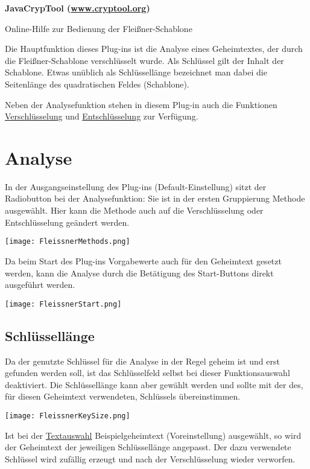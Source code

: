 \documentclass[fontsize=12pt, DIV=15, parskip=half-]{scrartcl}
\theoremstyle{break}
\begin{document}
\begin{center}
\Large\bfseries\sffamily JavaCrypTool (\url{www.cryptool.org})

Online-Hilfe zur Bedienung der Fleißner-Schablone  \\[0.1\baselineskip]
\normalsize\normalfont 
\end{center}
\vspace*{0.5\baselineskip}


\tableofcontents
\newpage

Die Hauptfunktion dieses Plug-ins ist die Analyse eines Geheimtextes, der durch die Fleißner-Schablone verschlüsselt wurde. Als Schlüssel gilt der Inhalt der Schablone. Etwas unüblich als Schlüssellänge bezeichnet man dabei die Seitenlänge des quadratischen Feldes (Schablone).

Neben der Analysefunktion stehen in diesem Plug-in auch die Funktionen \hyperlink{verschl}{Verschlüsselung} und \hyperlink{entschl}{Entschlüsselung} zur Verfügung.


\section{Analyse}
In der Ausgangseinstellung des Plug-ins (Default-Einstellung) sitzt der Radiobutton bei der Analysefunktion: Sie ist in der ersten Gruppierung \glqq Methode\grqq{}
ausgewählt. Hier kann die Methode auch auf die Verschlüsselung oder Entschlüsselung geändert werden.

\texttt{[image: FleissnerMethods.png]}

Da beim Start des Plug-ins Vorgabewerte auch für den Geheimtext gesetzt werden, kann die Analyse durch die Betätigung des \glqq Start\grqq{}-Buttons direkt ausgeführt werden. 

\texttt{[image: FleissnerStart.png]}

\subsection{Schlüssellänge}
Da der genutzte Schlüssel für die Analyse in der Regel geheim ist und erst gefunden werden soll, ist das Schlüsselfeld selbst bei dieser Funktionsauswahl deaktiviert. Die Schlüssellänge kann aber gewählt werden und sollte mit der des, für diesen Geheimtext verwendeten, Schlüssels übereinstimmen.

\texttt{[image: FleissnerKeySize.png]}


Ist bei der \hyperlink{txtausw}{Textauswahl}  \glqq Beispielgeheimtext\grqq{} (Voreinstellung) ausgewählt, so wird der Geheimtext der jeweiligen Schlüssellänge angepasst. Der dazu verwendete Schlüssel wird zufällig erzeugt und nach der Verschlüsselung wieder verworfen.
\end{document}
